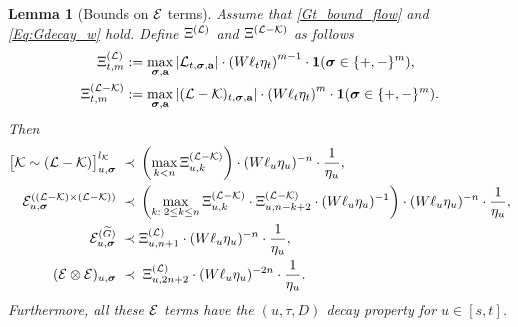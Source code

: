 \documentclass[10pt,reqno]{article}
\theoremstyle{plain} %
\newtheorem{lemma}[theorem]{Lemma}
\theoremstyle{remark}
\numberwithin{equation}{section}
\begin{document}




 \begin{lemma}[Bounds on $\cal E$ terms] \label{lem_BcalE} 
Assume  that \eqref{Gt_bound_flow} and \eqref{Eq:Gdecay_w} hold.  
Define $\Xi^{({\cal L})}$ and  $\Xi^{({\cal L}-{\cal K})}$ as follows
\begin{align}\label{def:XIL-K}
  \Xi^{({\cal L} )}_{t, m} &:= \max_{\boldsymbol{\sigma}, \textbf{a}} \left|{\cal L} _{t, \boldsymbol{\sigma}, \textbf{a}} \right|\cdot \left(W\ell_t \eta_t\right)^{m-1} \cdot {\bf 1}(\boldsymbol{\sigma} \in \{+, -\}^m),  
\\\nonumber
     \Xi^{({\cal L}-{\cal K})}_{t, m} &:= \max_{\boldsymbol{\sigma}, \textbf{a}} \left|({\cal L}-{\cal K})_{t, \boldsymbol{\sigma}, \textbf{a}} \right|\cdot \left(W\ell_t \eta_t\right)^{m} \cdot {\bf 1}(\boldsymbol{\sigma} \in \{+, -\}^m).
\end{align}
Then 
\begin{align}\label{CalEbwXi}
\big[\mathcal{K} \sim(\mathcal{L}-\mathcal{K})\big]_{u, \boldsymbol{\sigma}}^{l_{\mathcal{K}}}
   \; \prec \; &
   \left( \max_{k<n }\Xi^{(\cal L-\cal K)}_{u,k}\right)\cdot (W\ell_u\eta_u)^{-n }\cdot \frac{1}{\eta_u}  , 
   \nonumber \\
    \mathcal{E}_{u, \boldsymbol{\sigma}}^{((\mathcal{L} - \mathcal{K}) \times (\mathcal{L} - \mathcal{K}))}
    \; \prec \; &
   \left( \max_{k:\;2\le k\le n }\Xi^{(\cal L-\cal K)}_{u,k}\cdot \Xi^{(\cal L-\cal K)}_{u,n-k+2}\cdot(W\ell_u\eta_u)^{-1}\right)\cdot (W\ell_u\eta_u)^{-n }\cdot \frac{1}{\eta_u}  , 
  \nonumber \\  \mathcal{E}_{u, \boldsymbol{\sigma}}^{(\widetilde{G})}
 \; \prec \; &
     \Xi^{(\cal L)}_{u,n+1} \cdot (W\ell_u\eta_u)^{-n }\cdot \frac{1}{\eta_u}   ,  
  \nonumber \\   
(\mathcal{E} \otimes \mathcal{E}) _{u, \boldsymbol{\sigma}}
\; \prec \; &  \; \Xi^{(\cal L)}_{u, {2n+2}}\cdot   (W\ell_u\eta_u)^{-2n } \cdot \frac1{\eta_u}. 
\end{align}
Furthermore, 
all these  $\cal E$ terms have the $(u, \tau, D)$ decay property for  $u\in [s,t]$.  
 \end{lemma}
 
\end{document}
